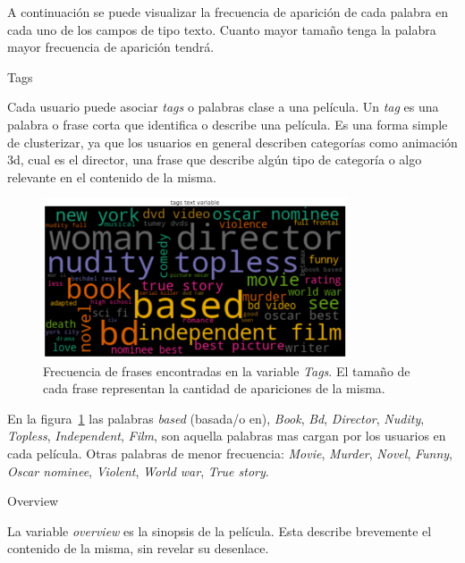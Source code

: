 \documentclass[11pt,a4paper,twoside]{thesis}
\begin{document}
A continuación se puede visualizar la frecuencia de aparición de cada palabra
en cada uno de los campos de tipo texto. Cuanto mayor tamaño tenga la palabra
mayor frecuencia de aparición tendrá.

\begin{description}
	\item[Tags]
\end{description}

Cada usuario puede asociar \textit{tags} o palabras clase a una película. Un
\textit{tag} es una palabra o frase corta que identifica o describe una
película. Es una forma simple de clusterizar, ya que los usuarios en general
describen categorías como animación 3d, cual es el director, una frase que
describe algún tipo de categoría o algo relevante en el contenido de la misma.

\begin{figure}[h!]
	\centering
	\includegraphics[width=9cm]{./images/Cloud-tags.png}
	\caption{Frecuencia de frases encontradas en la variable \textit{Tags}. El tamaño de cada frase representan la cantidad de apariciones de la misma.}
	\label{fig:tagsCloud}
\end{figure}

En la figura~\ref{fig:tagsCloud} las palabras \textit{based} (basada/o en),
\textit{Book}, \textit{Bd}, \textit{Director}, \textit{Nudity},
\textit{Topless}, \textit{Independent}, \textit{Film}, son aquella palabras mas
cargan por los usuarios en cada película. Otras palabras de menor frecuencia:
\textit{Movie}, \textit{Murder}, \textit{Novel}, \textit{Funny}, \textit{Oscar
	nominee}, \textit{Violent}, \textit{World war}, \textit{True story}.

\clearpage

\begin{description}
	\item[Overview]
\end{description}

La variable \textit{overview} es la sinopsis de la película. Esta describe
brevemente el contenido de la misma, sin revelar su desenlace.
\end{document}
